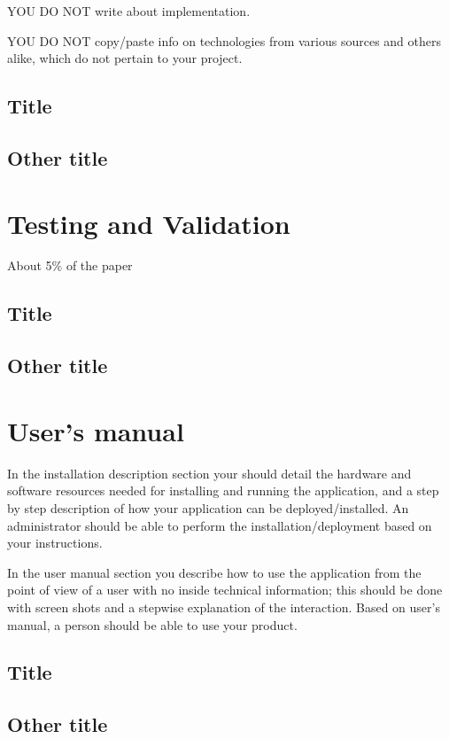 \documentclass[12pt,a4paper,twoside]{report}
\begin{document}
{\color{red} YOU DO NOT write about implementation.

YOU DO NOT copy/paste info on technologies from various sources and others alike, which do not pertain to your project.
}

\section{Title}
\section{Other title}



\chapter{Testing and Validation}

About 5\% of the paper
\section{Title}
\section{Other title}

\chapter{User's manual}

In the installation description section your should detail the hardware and software resources needed for installing and running the application, and a step by step description of how your application can be deployed/installed. An administrator should be able to perform the installation/deployment based on your instructions.

In the user manual section you describe how to use the application from the point of view of a user with no inside technical information; this should be done with screen shots and a stepwise explanation of the interaction. Based on user's manual, a person should be able to use your product.

\section{Title}
\section{Other title}
\end{document}
